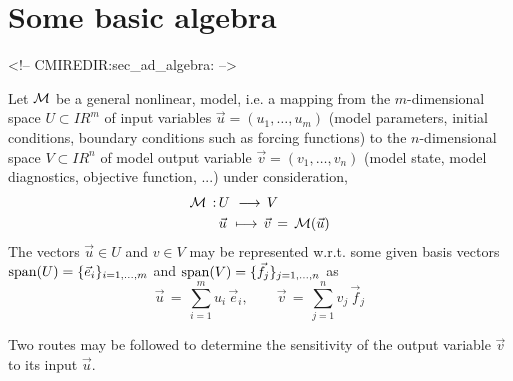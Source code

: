 \section{Some basic algebra}
\label{sec_ad_algebra}
\begin{rawhtml}
<!-- CMIREDIR:sec_ad_algebra: -->
\end{rawhtml}

Let $ \cal{M} $ be a general nonlinear, model, i.e. a
mapping from the $m$-dimensional space 
$U \subset I\!\!R^m$ of input variables 
$\vec{u}=(u_1,\ldots,u_m)$
(model parameters, initial conditions, boundary conditions
such as forcing functions) to the $n$-dimensional space 
$V \subset I\!\!R^n$ of 
model output variable $\vec{v}=(v_1,\ldots,v_n)$ 
(model state, model diagnostics, objective function, ...) 
under consideration,
%
\begin{equation}
\begin{aligned}
{\cal M} \, : & \, U \,\, \longrightarrow \, V \\
~      & \, \vec{u} \,\, \longmapsto \, \vec{v} \, = \, 
{\cal M}(\vec{u}) 
\label{fulloperator}
\end{aligned}
\end{equation}
%
The vectors $ \vec{u} \in U $ and $ v \in V $ may be represented w.r.t.
some given basis vectors
$ {\rm span} (U) = \{ {\vec{e}_i} \}_{i = 1, \ldots , m} $ and
$ {\rm span} (V) = \{ {\vec{f}_j} \}_{j = 1, \ldots , n} $ as
\[
\vec{u} \, = \, \sum_{i=1}^{m} u_i \, {\vec{e}_i},
\qquad
\vec{v} \, = \, \sum_{j=1}^{n} v_j \, {\vec{f}_j}
\]

Two routes may be followed to determine the sensitivity of the 
output variable $\vec{v}$ to its input $\vec{u}$.

